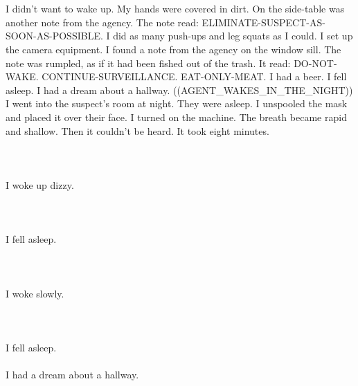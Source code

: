 \documentclass{article}
\begin{document}
    \section{}
    I didn't want to wake up. My hands were covered in dirt. On the side-table was another note from the agency. The note read: ELIMINATE-SUSPECT-AS-SOON-AS-POSSIBLE. I did as many push-ups and leg squats as I could. I set up the camera equipment. I found a note from the agency on the window sill. The note was rumpled, as if it had been fished out of the trash. It read: DO-NOT-WAKE. CONTINUE-SURVEILLANCE. EAT-ONLY-MEAT. I had a beer. I fell asleep. I had a dream about a hallway. ((AGENT_WAKES_IN_THE_NIGHT)) I went into the suspect's room at night. They were asleep. I unspooled the mask and placed it over their face. I turned on the machine. The breath became rapid and shallow. Then it couldn't be heard. It took eight minutes. \\\\
    \newpage
    
    \section{}
    I woke up dizzy.\\\\ 
    \newpage
    
    \section{}
    I fell asleep.\\\\ 
    \newpage
    
    \section{}
    I woke slowly.\\\\ 
    \newpage
    
    \section{}
    I fell asleep.\\\\I had a dream about a hallway.\\\\ 
    \newpage
    
    
\end{document}
